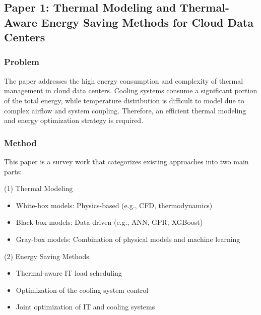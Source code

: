 \documentclass[12pt,a4paper]{article}
\begin{document}
\subsection{Paper 1: Thermal Modeling and Thermal-Aware Energy Saving Methods for Cloud Data Centers}
    
        \subsubsection{Problem}
        
                        The paper addresses the high energy consumption and complexity of thermal management in cloud data centers. Cooling systems consume a significant portion of the total energy, while temperature distribution is difficult to model due to complex airflow and system coupling. Therefore, an efficient thermal modeling and energy optimization strategy is required.

        \subsubsection{Method}

                        This paper is a survey work that categorizes existing approaches into two main parts:
    
         (1) Thermal Modeling
                     
                        \begin{itemize}
                        \item White-box models: Physics-based (e.g., CFD, thermodynamics)
                        \item Black-box models: Data-driven (e.g., ANN, GPR, XGBoost)
                        \item Gray-box models: Combination of physical models and machine learning
                        \end{itemize}
                    
                         
        (2) Energy Saving Methods
      
                        \begin{itemize}
                        \item Thermal-aware IT load scheduling
                        \item Optimization of the cooling system control
                        \item Joint optimization of IT and cooling systems
                        \end{itemize}
\end{document}
